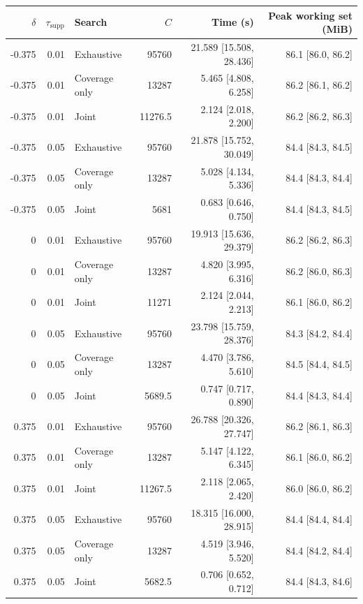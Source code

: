\begin{table}
\label{tab:computational-parameters}
\begin{tabular}{rrlrrr}
\toprule
$\delta$ & $\tau_{\mathrm{supp}}$ & Search & $C$ & Time (s) & Peak working set (MiB) \\
\midrule
-0.375 & 0.01 & Exhaustive & 95760 & 21.589 [15.508, 28.436] & 86.1 [86.0, 86.2] \\
-0.375 & 0.01 & Coverage only & 13287 & 5.465 [4.808, 6.258] & 86.2 [86.1, 86.2] \\
-0.375 & 0.01 & Joint & 11276.5 & 2.124 [2.018, 2.200] & 86.2 [86.2, 86.3] \\
-0.375 & 0.05 & Exhaustive & 95760 & 21.878 [15.752, 30.049] & 84.4 [84.3, 84.5] \\
-0.375 & 0.05 & Coverage only & 13287 & 5.028 [4.134, 5.336] & 84.4 [84.3, 84.4] \\
-0.375 & 0.05 & Joint & 5681 & 0.683 [0.646, 0.750] & 84.4 [84.3, 84.5] \\
0 & 0.01 & Exhaustive & 95760 & 19.913 [15.636, 29.379] & 86.2 [86.2, 86.3] \\
0 & 0.01 & Coverage only & 13287 & 4.820 [3.995, 6.316] & 86.2 [86.0, 86.3] \\
0 & 0.01 & Joint & 11271 & 2.124 [2.044, 2.213] & 86.1 [86.0, 86.2] \\
0 & 0.05 & Exhaustive & 95760 & 23.798 [15.759, 28.376] & 84.3 [84.2, 84.4] \\
0 & 0.05 & Coverage only & 13287 & 4.470 [3.786, 5.610] & 84.5 [84.4, 84.5] \\
0 & 0.05 & Joint & 5689.5 & 0.747 [0.717, 0.890] & 84.4 [84.3, 84.4] \\
0.375 & 0.01 & Exhaustive & 95760 & 26.788 [20.326, 27.747] & 86.2 [86.1, 86.3] \\
0.375 & 0.01 & Coverage only & 13287 & 5.147 [4.122, 6.345] & 86.1 [86.0, 86.2] \\
0.375 & 0.01 & Joint & 11267.5 & 2.118 [2.065, 2.420] & 86.0 [86.0, 86.2] \\
0.375 & 0.05 & Exhaustive & 95760 & 18.315 [16.000, 28.915] & 84.4 [84.4, 84.4] \\
0.375 & 0.05 & Coverage only & 13287 & 4.519 [3.946, 5.520] & 84.4 [84.2, 84.4] \\
0.375 & 0.05 & Joint & 5682.5 & 0.706 [0.652, 0.712] & 84.4 [84.3, 84.6] \\
\bottomrule
\end{tabular}
\end{table}

